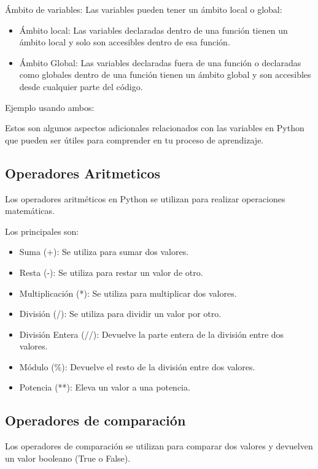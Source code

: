 Ámbito de variables: Las variables pueden tener un ámbito local o global:
\begin{itemize}
    \item Ámbito local: Las variables declaradas dentro de una función tienen un ámbito local y solo son accesibles dentro de esa función.
    \item Ámbito Global: Las variables declaradas fuera de una función o declaradas como globales dentro de una función tienen un ámbito global y son accesibles desde cualquier parte del código.
\end{itemize}
Ejemplo usando ambos:

Estos son algunos aspectos adicionales relacionados con las variables en Python que pueden ser útiles para comprender en tu proceso de aprendizaje.

\subsection{Operadores Aritmeticos}
Los operadores aritméticos en Python se utilizan para realizar operaciones matemáticas. 

Los principales son:
\begin{itemize}
    \item Suma (+): Se utiliza para sumar dos valores.
    \item Resta (-): Se utiliza para restar un valor de otro.
    \item Multiplicación (*): Se utiliza para multiplicar dos valores.
    \item División (/): Se utiliza para dividir un valor por otro.
    \item División Entera (//): Devuelve la parte entera de la división entre dos valores.
    \item Módulo (\%): Devuelve el resto de la división entre dos valores.
    \item Potencia (**): Eleva un valor a una potencia.
  \end{itemize}  

\subsection{Operadores de comparación}
Los operadores de comparación se utilizan para comparar dos valores y devuelven un valor booleano (True o False). 

